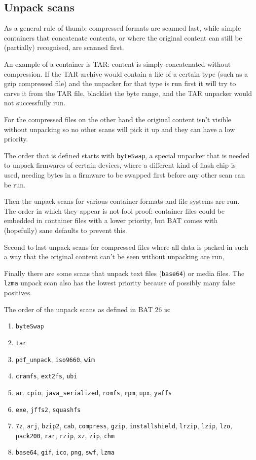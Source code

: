 \documentclass[10pt,a4paper]{article}
\begin{document}
\subsection{Unpack scans}

As a general rule of thumb: compressed formats are scanned last, while
simple containers that concatenate contents, or where the original content can
still be (partially) recognised, are scanned first.

An example of a container is TAR: content is simply concatenated without
compression. If the TAR archive would contain a file of a certain type (such as
a gzip compressed file) and the unpacker for that type is run first it will try
to carve it from the TAR file, blacklist the byte range, and the TAR unpacker
would not successfully run.

For the compressed files on the other hand the original content isn't visible
without unpacking so no other scans will pick it up and they can have a low
priority.

The order that is defined starts with \texttt{byteSwap}, a special unpacker
that is needed to unpack firmwares of certain devices, where a different kind
of flash chip is used, needing bytes in a firmware to be swapped first before
any other scan can be run.

Then the unpack scans for various container formats and file systems are run.
The order in which they appear is not fool proof: container files could be
embedded in container files with a lower priority, but BAT comes with
(hopefully) sane defaults to prevent this.

Second to last unpack scans for compressed files where all data is packed in
such a way that the original content can't be seen without unpacking are run,

Finally there are some scans that unpack text files (\texttt{base64}) or media
files. The \texttt{lzma} unpack scan also has the lowest priority because of
possibly many false positives.

The order of the unpack scans as defined in BAT 26 is:

\begin{enumerate}
\item \texttt{byteSwap}
\item \texttt{tar}
\item \texttt{pdf\_unpack}, \texttt{iso9660}, \texttt{wim}
\item \texttt{cramfs}, \texttt{ext2fs}, \texttt{ubi}
\item \texttt{ar}, \texttt{cpio}, \texttt{java\_serialized}, \texttt{romfs},
\texttt{rpm}, \texttt{upx}, \texttt{yaffs}
\item \texttt{exe}, \texttt{jffs2}, \texttt{squashfs}
\item \texttt{7z}, \texttt{arj}, \texttt{bzip2}, \texttt{cab},
\texttt{compress}, \texttt{gzip}, \texttt{installshield}, \texttt{lrzip},
\texttt{lzip}, \texttt{lzo}, \texttt{pack200}, \texttt{rar}, \texttt{rzip},
\texttt{xz}, \texttt{zip}, \texttt{chm}
\item \texttt{base64}, \texttt{gif}, \texttt{ico}, \texttt{png}, \texttt{swf},
\texttt{lzma}
\end{enumerate}
\end{document}

